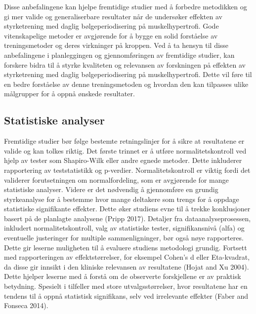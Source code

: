 \documentclass[
  letterpaper,
  DIV=11,
  numbers=noendperiod]{scrreprt}
\begin{document}
Disse anbefalingene kan hjelpe fremtidige studier med å forbedre
metodikken og gi mer valide og generaliserbare resultater når de
undersøker effekten av styrketrening med daglig bølgeperiodisering på
muskelhypertrofi. Gode vitenskapelige metoder er avgjørende for å bygge
en solid forståelse av treningsmetoder og deres virkninger på kroppen.
Ved å ta hensyn til disse anbefalingene i planleggingen og
gjennomføringen av fremtidige studier, kan forskere bidra til å styrke
kvaliteten og relevansen av forskningen på effekten av styrketrening med
daglig bølgeperiodisering på muskelhypertrofi. Dette vil føre til en
bedre forståelse av denne treningsmetoden og hvordan den kan tilpasses
ulike målgrupper for å oppnå ønskede resultater.

\hypertarget{statistiske-analyser-2}{%
\subsection{Statistiske analyser}\label{statistiske-analyser-2}}

Fremtidige studier bør følge bestemte retningslinjer for å sikre at
resultatene er valide og kan tolkes riktig. Det første trinnet er å
utføre normalitetskontroll ved hjelp av tester som Shapiro-Wilk eller
andre egnede metoder. Dette inkluderer rapportering av teststatistikk og
p-verdier. Normalitetskontroll er viktig fordi det validerer
forutsetningen om normalfordeling, som er avgjørende for mange
statistiske analyser. Videre er det nødvendig å gjennomføre en grundig
styrkeanalyse for å bestemme hvor mange deltakere som trengs for å
oppdage statistiske signifikante effekter. Dette øker studiens evne til
å trekke konklusjoner basert på de planlagte analysene (Pripp 2017).
Detaljer fra dataanalyseprosessen, inkludert normalitetskontroll, valg
av statistiske tester, signifikansnivå (alfa) og eventuelle justeringer
for multiple sammenligninger, bør også nøye rapporteres. Dette gir
leserne muligheten til å evaluere studiens metodologi grundig. Fortsett
med rapporteringen av effektstørrelser, for eksempel Cohen's d eller
Eta-kvadrat, da disse gir innsikt i den kliniske relevansen av
resultatene (Hojat and Xu 2004). Dette hjelper leserne med å forstå om
de observerte forskjellene er av praktisk betydning. Spesielt i
tilfeller med store utvalgsstørrelser, hvor resultatene har en tendens
til å oppnå statistisk signifikans, selv ved irrelevante effekter (Faber
and Fonseca 2014).
\end{document}
